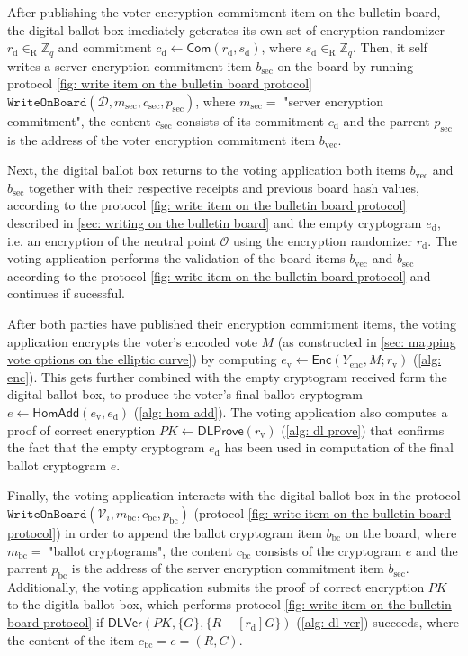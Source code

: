 After publishing the voter encryption commitment item on the bulletin board, the digital ballot box imediately geterates its own set of encryption randomizer $r_\mathrm{d} \in_\mathrm{R} \mathbb{Z}_q$ and commitment $c_\mathrm{d} \gets \mathsf{Com}(r_\mathrm{d}, s_\mathrm{d})$, where $s_\mathrm{d} \in_\mathrm{R} \mathbb{Z}_q$. Then, it self writes a server encryption commitment item $b_\mathrm{sec}$ on the board by running protocol \ref{fig: write item on the bulletin board protocol} $\mathtt{WriteOnBoard}(\mathcal{D}, m_\mathrm{sec}, c_\mathrm{sec}, p_\mathrm{sec})$, where $m_\mathrm{sec} =$ "server encryption commitment", the content $c_\mathrm{sec}$ consists of its commitment $c_\mathrm{d}$ and the parrent $p_\mathrm{sec}$ is the address of the voter encryption commitment item $b_\mathrm{vec}$.

Next, the digital ballot box returns to the voting application both items $b_\mathrm{vec}$ and $b_\mathrm{sec}$ together with their respective receipts and previous board hash values, according to the protocol \ref{fig: write item on the bulletin board protocol} described in \cref{sec: writing on the bulletin board} and the empty cryptogram $e_\mathrm{d}$, i.e. an encryption of the neutral point $\mathcal{O}$ using the encryption randomizer $r_\mathrm{d}$. The voting application performs the validation of the board items $b_\mathrm{vec}$ and $b_\mathrm{sec}$ according to the protocol \ref{fig: write item on the bulletin board protocol} and continues if sucessful.

After both parties have published their encryption commitment items, the voting application encrypts the voter's encoded vote $M$ (as constructed in \cref{sec: mapping vote options on the elliptic curve}) by computing $e_\mathrm{v} \gets \mathsf{Enc}(Y_\mathrm{enc}, M; r_\mathrm{v})$ (\cref{alg: enc}). This gets further combined with the empty cryptogram received form the digital ballot box, to produce the voter's final ballot cryptogram $e \gets \mathsf{HomAdd}(e_\mathrm{v}, e_\mathrm{d})$ (\cref{alg: hom add}). The voting application also computes a proof of correct encryption $PK \gets \mathsf{DLProve}(r_\mathrm{v})$ (\cref{alg: dl prove}) that confirms the fact that the empty cryptogram $e_\mathrm{d}$ has been used in computation of the final ballot cryptogram $e$.

Finally, the voting application interacts with the digital ballot box in the protocol $\mathtt{WriteOnBoard}(\mathcal{V}_i, m_\mathrm{bc}, c_\mathrm{bc}, p_\mathrm{bc})$ (protocol \ref{fig: write item on the bulletin board protocol}) in order to append the ballot cryptogram item $b_\mathrm{bc}$ on the board, where $m_\mathrm{bc} =$ "ballot cryptograms", the content $c_\mathrm{bc}$ consists of the cryptogram $e$ and the parrent $p_\mathrm{bc}$ is the address of the server encryption commitment item $b_\mathrm{sec}$. Additionally, the voting application submits the proof of correct encryption $PK$ to the digitla ballot box, which performs protocol \ref{fig: write item on the bulletin board protocol} if $\mathsf{DLVer}(PK, \{ G \}, \{ R - [r_\mathrm{d}]G \})$ (\cref{alg: dl ver}) succeeds, where the content of the item $c_\mathrm{bc} = e = (R, C)$.


